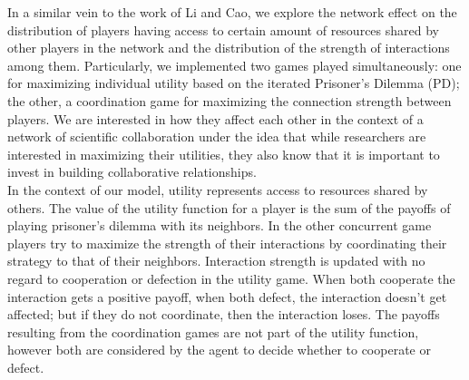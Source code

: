 \documentclass{bmcart}
\begin{document}




{\color{red}In a similar vein to the work of Li and Cao,} we explore the network
effect on the distribution of players having access to certain amount of
resources shared by other players in the network and the distribution of the
strength of interactions among them. Particularly, we implemented two games
played simultaneously: one for maximizing individual utility based on the
iterated Prisoner's Dilemma (PD); the other, a coordination game for maximizing the
connection strength between players. We are interested in how they affect each
other in the context of a network of scientific collaboration under the idea
that while researchers are interested in maximizing their utilities, they also
know that it is important to invest in building collaborative
relationships. \\ %


In the context of our model, utility represents access to resources
shared by others. The value of the utility function for a player is
the sum of the payoffs of playing prisoner's dilemma with its
neighbors. In the other concurrent game players try to maximize the
strength of their interactions by coordinating their strategy to that
of their neighbors. Interaction strength is updated with no regard to
cooperation or defection in the utility game. When both cooperate the
interaction gets a positive payoff, when both defect, the interaction
doesn't get affected; but if they do not coordinate, then the
interaction loses. The payoffs resulting from the coordination games
are not part of the utility function, however both are considered by
the agent to decide whether to cooperate or defect. \\
\end{document}
